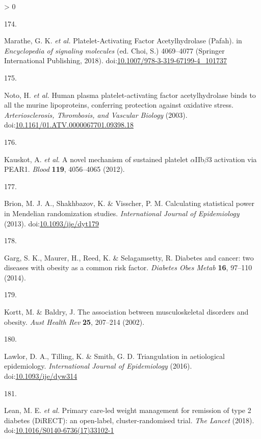 \documentclass[11pt,twoside]{bristolthesis}
\newlength{\cslhangindent}
\newlength{\csllabelwidth}
\newenvironment{CSLReferences}[2] %
 {%
  \setlength{\parindent}{0pt}
  \ifodd #1 \everypar{\setlength{\hangindent}{\cslhangindent}}\ignorespaces\fi
  \ifnum #2 > 0
  \setlength{\parskip}{#2\baselineskip}
  \fi
 }%
 {}
\newcommand{\CSLLeftMargin}[1]{\parbox[t]{\csllabelwidth}{#1}}
\newcommand{\CSLRightInline}[1]{\parbox[t]{\linewidth - \csllabelwidth}{#1}\break}
\begin{document}
\begin{CSLReferences}{0}{0}
\leavevmode\hypertarget{ref-Marathe2018}{}%
\CSLLeftMargin{174. }
\CSLRightInline{Marathe, G. K. \emph{et al.} {Platelet-Activating Factor Acetylhydrolase (Pafah)}. in \emph{Encyclopedia of signaling molecules} (ed. Choi, S.) 4069--4077 (Springer International Publishing, 2018). doi:\href{https://doi.org/10.1007/978-3-319-67199-4_101737}{10.1007/978-3-319-67199-4\_101737}}

\leavevmode\hypertarget{ref-Noto2003}{}%
\CSLLeftMargin{175. }
\CSLRightInline{Noto, H. \emph{et al.} {Human plasma platelet-activating factor acetylhydrolase binds to all the murine lipoproteins, conferring protection against oxidative stress}. \emph{Arteriosclerosis, Thrombosis, and Vascular Biology} (2003). doi:\href{https://doi.org/10.1161/01.ATV.0000067701.09398.18}{10.1161/01.ATV.0000067701.09398.18}}

\leavevmode\hypertarget{ref-Kauskot2012}{}%
\CSLLeftMargin{176. }
\CSLRightInline{Kauskot, A. \emph{et al.} {A novel mechanism of sustained platelet \(\alpha\)IIb\(\beta\)3 activation via PEAR1.} \emph{Blood} \textbf{119}, 4056--4065 (2012).}

\leavevmode\hypertarget{ref-Brion2013}{}%
\CSLLeftMargin{177. }
\CSLRightInline{Brion, M. J. A., Shakhbazov, K. \& Visscher, P. M. {Calculating statistical power in Mendelian randomization studies}. \emph{International Journal of Epidemiology} (2013). doi:\href{https://doi.org/10.1093/ije/dyt179}{10.1093/ije/dyt179}}

\leavevmode\hypertarget{ref-Garg2014}{}%
\CSLLeftMargin{178. }
\CSLRightInline{Garg, S. K., Maurer, H., Reed, K. \& Selagamsetty, R. {Diabetes and cancer: two diseases with obesity as a common risk factor}. \emph{Diabetes Obes Metab} \textbf{16}, 97--110 (2014).}

\leavevmode\hypertarget{ref-Kortt2002}{}%
\CSLLeftMargin{179. }
\CSLRightInline{Kortt, M. \& Baldry, J. {The association between musculoskeletal disorders and obesity}. \emph{Aust Health Rev} \textbf{25}, 207--214 (2002).}

\leavevmode\hypertarget{ref-Lawlor2016}{}%
\CSLLeftMargin{180. }
\CSLRightInline{Lawlor, D. A., Tilling, K. \& Smith, G. D. {Triangulation in aetiological epidemiology}. \emph{International Journal of Epidemiology} (2016). doi:\href{https://doi.org/10.1093/ije/dyw314}{10.1093/ije/dyw314}}

\leavevmode\hypertarget{ref-Lean2018}{}%
\CSLLeftMargin{181. }
\CSLRightInline{Lean, M. E. \emph{et al.} {Primary care-led weight management for remission of type 2 diabetes (DiRECT): an open-label, cluster-randomised trial}. \emph{The Lancet} (2018). doi:\href{https://doi.org/10.1016/S0140-6736(17)33102-1}{10.1016/S0140-6736(17)33102-1}}


\end{CSLReferences}
\end{document}
